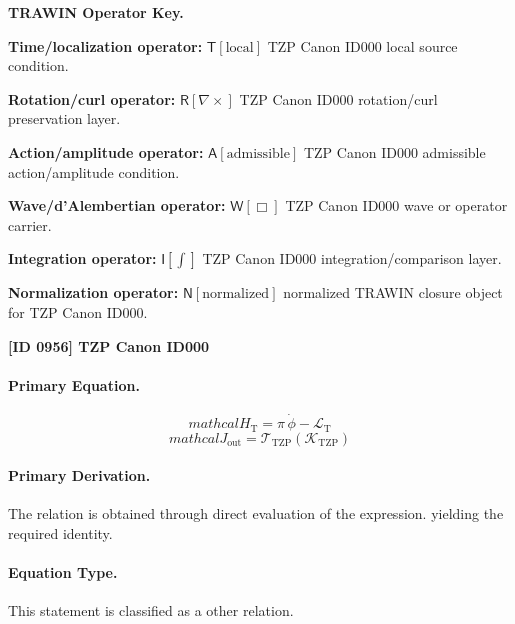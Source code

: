 \par\vspace{0.45\baselineskip}
\noindent\begin{minipage}[t]{\linewidth}
\begingroup
\small
\raggedright
\textbf{TRAWIN Operator Key.}\par
\noindent\textbf{Time/localization operator:} $\mathsf{T}\!\left[\mathrm{local}\right]$ TZP Canon ID000 local source condition.\par
\noindent\textbf{Rotation/curl operator:} $\mathsf{R}\!\left[\nabla\times\right]$ TZP Canon ID000 rotation/curl preservation layer.\par
\noindent\textbf{Action/amplitude operator:} $\mathsf{A}\!\left[\mathrm{admissible}\right]$ TZP Canon ID000 admissible action/amplitude condition.\par
\noindent\textbf{Wave/d'Alembertian operator:} $\mathsf{W}\!\left[\Box\right]$ TZP Canon ID000 wave or operator carrier.\par
\noindent\textbf{Integration operator:} $\mathsf{I}\!\left[\int\right]$ TZP Canon ID000 integration/comparison layer.\par
\noindent\textbf{Normalization operator:} $\mathsf{N}\!\left[\mathrm{normalized}\right]$ normalized TRAWIN closure object for TZP Canon ID000.\par
\endgroup
\end{minipage}

\clearpage
\noindent\textbf{[ID 0956] TZP Canon ID000}\par
\vspace{0.35em}
\paragraph{Primary Equation.}
\[
mathcal{H}_{\mathrm{T}}=\pi\,\dot{\phi}-\mathcal{L}_{\mathrm{T}}
\]
\[
mathcal{J}_{\mathrm{out}} = \mathcal{T}_{\mathrm{TZP}}\!\left(\mathcal{K}_{\mathrm{TZP}}\right)
\]

\paragraph{Primary Derivation.}
The relation is obtained through direct evaluation of the expression. yielding the required identity.
\paragraph{Equation Type.}
This statement is classified as a other relation.

